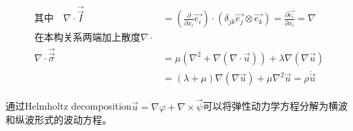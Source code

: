 \documentclass[12pt, a4paper, oneside, UTF8]{ctexbook}  %
\begin{document}
\begin{defn}
\begin{tui}
\begin{align*}
            \text{其中}\quad\nabla\cdot\vec{\vec{I}}&=\left(\frac{\partial}{\partial x_i}\vec{e_i}\right)
            \cdot\left(\delta_{jk}\vec{e_j}\otimes\vec{e_k}\right)=\frac{\partial\vec{e_i}}{\partial x_i}=\nabla\\
            \text{在本构关系两端加上散度$\nabla\cdot$}\\
            \nabla\cdot\vec{\vec{\sigma}}&=\mu\left(\nabla^2+\nabla\left(\nabla\cdot\vec{u}\right)\right)
            +\lambda\nabla\left(\nabla\vec{u}\right)\\
            &=\left(\lambda+\mu\right)\nabla\left(\nabla\vec{u}\right)+\mu\nabla^2\vec{u}=\rho\ddot{\vec{u}}
        \end{align*}
        \end{tui}
    \end{defn}
    \begin{corollary}
    通过Helmholtz decomposition\quad$\vec{u}=\nabla\varphi+\nabla\times\vec{\psi}$\quad 可以将弹性动力学方程分解为横波和纵波形式的波动方程。
    \end{corollary}
\end{document}
